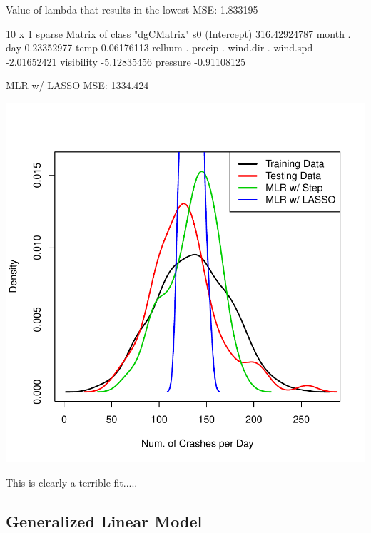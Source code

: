 \documentclass[11pt, a4paper]{article}
\begin{document}
\begin{Schunk}
\begin{Soutput}
Value of lambda that results in the lowest MSE: 1.833195
\end{Soutput}
\begin{Soutput}
10 x 1 sparse Matrix of class "dgCMatrix"
                      s0
(Intercept) 316.42924787
month         .         
day           0.23352977
temp          0.06176113
relhum        .         
precip        .         
wind.dir      .         
wind.spd     -2.01652421
visibility   -5.12835456
pressure     -0.91108125
\end{Soutput}
\begin{Soutput}
MLR w/ LASSO MSE: 1334.424
\end{Soutput}
\end{Schunk}
\includegraphics{regression-016}


This is clearly a terrible fit.....




\pagebreak
\subsection{Generalized Linear Model}
\end{document}
